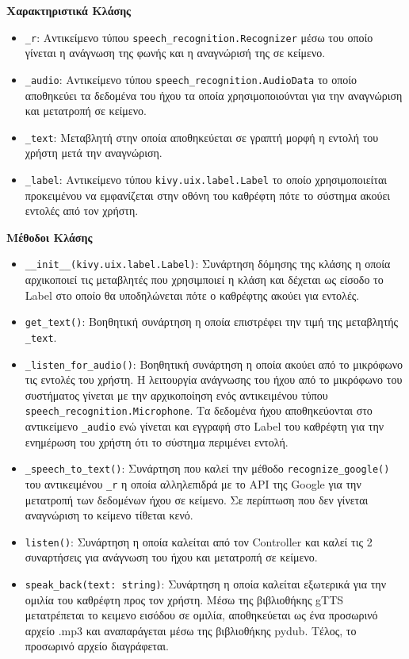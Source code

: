 \noindent\textbf{Χαρακτηριστικά Κλάσης}
\begin{itemize}
    \item \texttt{\_r}: Αντικείμενο τύπου \texttt{speech\_recognition.Recognizer} μέσω του οποίο γίνεται η ανάγνωση της φωνής και η αναγνώρισή της σε κείμενο.
    \item \texttt{\_audio}: Αντικείμενο τύπου \texttt{speech\_recognition.AudioData} το οποίο αποθηκεύει τα δεδομένα του ήχου τα οποία χρησιμοποιούνται για την αναγνώριση και μετατροπή σε κείμενο.
    \item \texttt{\_text}: Μεταβλητή στην οποία αποθηκεύεται σε γραπτή μορφή η εντολή του χρήστη μετά την αναγνώριση.
    \item \texttt{\_label}: Αντικείμενο τύπου \texttt{kivy.uix.label.Label} το οποίο χρησιμοποιείται προκειμένου να εμφανίζεται στην οθόνη του καθρέφτη πότε το σύστημα ακούει εντολές από τον χρήστη.
\end{itemize}
\noindent\textbf{Μέθοδοι Κλάσης}
\begin{itemize}
    \item \texttt{\_\_init\_\_(kivy.uix.label.Label)}: Συνάρτηση δόμησης της κλάσης η οποία αρχικοποιεί τις μεταβλητές που χρησιμποιεί η κλάση και δέχεται ως είσοδο το Label στο οποίο θα υποδηλώνεται πότε ο καθρέφτης ακούει για εντολές.
    \item \texttt{get\_text()}: Βοηθητική συνάρτηση η οποία επιστρέφει την τιμή της μεταβλητής \texttt{\_text}.
    \item \texttt{\_listen\_for\_audio()}: Βοηθητική συνάρτηση η οποία ακούει από το μικρόφωνο τις εντολές του χρήστη. Η λειτουργία ανάγνωσης του ήχου από το μικρόφωνο του συστήματος γίνεται με την αρχικοποίηση ενός αντικειμένου τύπου \texttt{speech\_recognition.Microphone}. Τα δεδομένα ήχου αποθηκεύονται στο αντικείμενο \texttt{\_audio} ενώ γίνεται και εγγραφή στο Label του καθρέφτη για την ενημέρωση του χρήστη ότι το σύστημα περιμένει εντολή.
    \item \texttt{\_speech\_to\_text()}: Συνάρτηση που καλεί την μέθοδο \texttt{recognize\_google()} του αντικειμένου \texttt{\_r} η οποία αλληλεπιδρά με το API της Google για την μετατροπή των δεδομένων ήχου σε κείμενο. Σε περίπτωση που δεν γίνεται αναγνώριση το κείμενο τίθεται κενό.
    \item \texttt{listen()}: Συνάρτηση η οποία καλείται από τον Controller και καλεί τις 2 συναρτήσεις για ανάγνωση του ήχου και μετατροπή σε κείμενο.
    \item \texttt{speak\_back(text: string)}: Συνάρτηση η οποία καλείται εξωτερικά για την ομιλία του καθρέφτη προς τον χρήστη. Μέσω της βιβλιοθήκης gTTS μετατρέπεται το κειμενο εισόδου σε ομιλία, αποθηκεύεται ως ένα προσωρινό αρχείο .mp3 και αναπαράγεται μέσω της βιβλιοθήκης pydub. Τέλος, το προσωρινό αρχείο διαγράφεται.
\end{itemize}
\newpage
